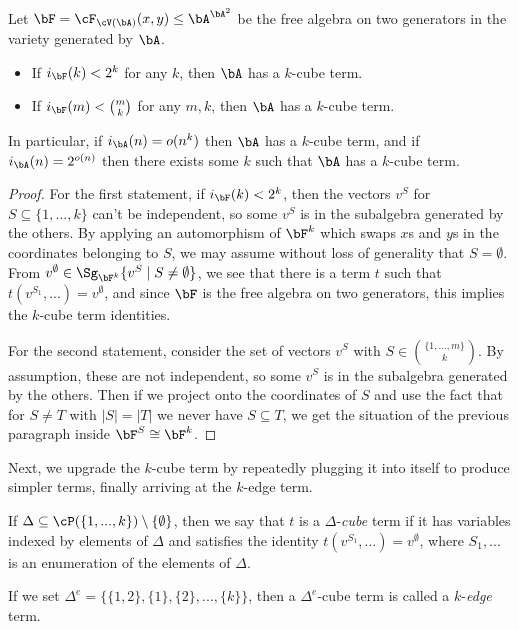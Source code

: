 \begin{thm} Let $\bF = \cF_{\cV(\bA)}(x,y) \le \bA^{\bA^2}$ be the free algebra on two generators in the variety generated by $\bA$.
\begin{itemize}
\item If $i_{\bF}(k) < 2^k$ for any $k$, then $\bA$ has a $k$-cube term.

\item If $i_{\bF}(m) < \binom{m}{k}$ for any $m,k$, then $\bA$ has a $k$-cube term.
\end{itemize}
In particular, if $i_\bA(n) = o(n^k)$ then $\bA$ has a $k$-cube term, and if $i_\bA(n) = 2^{o(n)}$ then there exists some $k$ such that $\bA$ has a $k$-cube term.
\end{thm}
\begin{proof} For the first statement, if $i_{\bF}(k) < 2^k$, then the vectors $v^S$ for $S \subseteq \{1, ..., k\}$ can't be independent, so some $v^S$ is in the subalgebra generated by the others. By applying an automorphism of $\bF^k$ which swaps $x$s and $y$s in the coordinates belonging to $S$, we may assume without loss of generality that $S = \emptyset$. From $v^\emptyset \in \Sg_{\bF^k}\{v^S \mid S \ne \emptyset\}$, we see that there is a term $t$ such that $t(v^{S_1}, ...) = v^\emptyset$, and since $\bF$ is the free algebra on two generators, this implies the $k$-cube term identities.

For the second statement, consider the set of vectors $v^S$ with $S \in \binom{\{1, ..., m\}}{k}$. By assumption, these are not independent, so some $v^S$ is in the subalgebra generated by the others. Then if we project onto the coordinates of $S$ and use the fact that for $S \ne T$ with $|S| = |T|$ we never have $S \subseteq T$, we get the situation of the previous paragraph inside $\bF^S \cong \bF^k$.
\end{proof}

Next, we upgrade the $k$-cube term by repeatedly plugging it into itself to produce simpler terms, finally arriving at the $k$-edge term.

\begin{defn} If $\Delta \subseteq \cP(\{1, ..., k\}) \setminus \{\emptyset\}$, then we say that $t$ is a $\Delta$-\emph{cube} term if it has variables indexed by elements of $\Delta$ and satisfies the identity $t(v^{S_1}, ...) = v^\emptyset$, where $S_1, ...$ is an enumeration of the elements of $\Delta$.

If we set $\Delta^e = \{\{1,2\}, \{1\}, \{2\}, ..., \{k\}\}$, then a $\Delta^e$-cube term is called a $k$-\emph{edge} term.
\end{defn}

